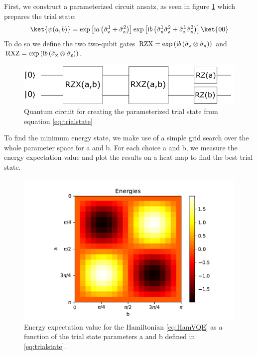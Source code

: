 First, we construct a parameterized circuit ansatz, as seen in figure \ref{fig:variational_ansatz} which prepares the trial state: 
\begin{equation}
    \label{eq:trialstate}
    \ket{\psi(a, b)} = \exp\left[\mathrm{i}a \left(\sigmaz^1+\sigmaz^2\right)\right] \exp\left[\mathrm{i}b\left(\sigmax^1\sigmaz^2 + \sigmaz^1\sigmax^2\right)\right] \ket{00}
\end{equation}
To do so we define the two two-qubit gates $\mathrm{RZX} = \exp\left(\mathrm{i}b\left(\sigmaz \otimes \sigmax\right)\right)$ and $\mathrm{RXZ} = \exp\left(\mathrm{i}b\left(\sigmax \otimes \sigmaz\right)\right)$. 

\begin{figure}[h]
    \centering
    \includegraphics[width=0.6\linewidth]{tex/figures/CircuitEx10.png}
    \caption{Quantum circuit for creating the parameterized trial state from equation \eqref{eq:trialstate}}
    \label{fig:variational_ansatz}
\end{figure}

To find the minimum energy state, we make use of a simple grid search over the whole parameter space for a and b. For each choice a and b, we measure the energy expectation value and plot the results on a heat map to find the best trial state. 

\begin{figure}[h]
    \centering
    \includegraphics[width=0.8\linewidth]{tex/figures/exercise12.pdf}
    \caption{Energy expectation value for the Hamiltonian \eqref{eq:HamVQE} as a function of the trial state parameters a and b defined in \eqref{eq:trialstate}.}
    \label{fig:heatmap1}
\end{figure}

